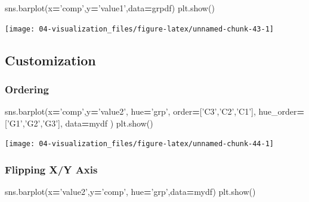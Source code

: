\documentclass[
]{book}
\newenvironment{Shaded}{\begin{snugshade}}{\end{snugshade}}
\newcommand{\NormalTok}[1]{#1}
\newcommand{\OperatorTok}[1]{\textcolor[rgb]{0.43,0.43,0.43}{\textbf{#1}}}
\newcommand{\StringTok}[1]{\textcolor[rgb]{0.5,0.5,0.5}{#1}}
\begin{document}
\begin{Shaded}
\begin{Highlighting}[]
\NormalTok{sns.barplot(x}\OperatorTok{=}\StringTok{'comp'}\NormalTok{,y}\OperatorTok{=}\StringTok{'value1'}\NormalTok{,data}\OperatorTok{=}\NormalTok{grpdf)}
\NormalTok{plt.show()}
\end{Highlighting}
\end{Shaded}

\texttt{[image: 04-visualization\_files/figure-latex/unnamed-chunk-43-1]}

\hypertarget{customization-1}{%
\subsection{Customization}\label{customization-1}}

\hypertarget{ordering}{%
\subsubsection{Ordering}\label{ordering}}

\begin{Shaded}
\begin{Highlighting}[]
\NormalTok{sns.barplot(x}\OperatorTok{=}\StringTok{'comp'}\NormalTok{,y}\OperatorTok{=}\StringTok{'value2'}\NormalTok{, hue}\OperatorTok{=}\StringTok{'grp'}\NormalTok{,}
\NormalTok{            order}\OperatorTok{=}\NormalTok{[}\StringTok{'C3'}\NormalTok{,}\StringTok{'C2'}\NormalTok{,}\StringTok{'C1'}\NormalTok{],}
\NormalTok{            hue_order}\OperatorTok{=}\NormalTok{[}\StringTok{'G1'}\NormalTok{,}\StringTok{'G2'}\NormalTok{,}\StringTok{'G3'}\NormalTok{],}
\NormalTok{            data}\OperatorTok{=}\NormalTok{mydf}
\NormalTok{)}
\NormalTok{plt.show()}
\end{Highlighting}
\end{Shaded}

\texttt{[image: 04-visualization\_files/figure-latex/unnamed-chunk-44-1]}

\hypertarget{flipping-xy-axis}{%
\subsubsection{Flipping X/Y Axis}\label{flipping-xy-axis}}

\begin{Shaded}
\begin{Highlighting}[]
\NormalTok{sns.barplot(x}\OperatorTok{=}\StringTok{'value2'}\NormalTok{,y}\OperatorTok{=}\StringTok{'comp'}\NormalTok{, hue}\OperatorTok{=}\StringTok{'grp'}\NormalTok{,data}\OperatorTok{=}\NormalTok{mydf)}
\NormalTok{plt.show()}
\end{Highlighting}
\end{Shaded}
\end{document}
